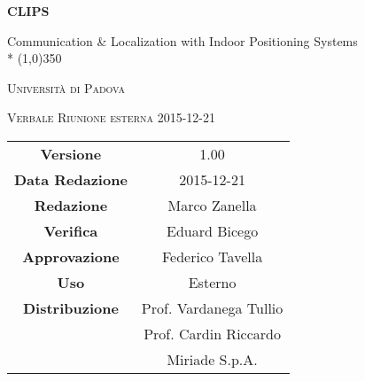 \documentclass[a4paper,12pt]{article}
\author{Marco Zanella}
\date{22/12/2015}
\begin{document}
\begin{titlepage}
	\centering
	{\huge\bfseries CLIPS\par}
	Communication \& Localization with Indoor Positioning Systems \\*
	\line(1,0){350} \\
	{\scshape\LARGE Università di Padova \par}
	\vspace{1cm}
	{\scshape\Large Verbale Riunione esterna 2015-12-21 \par}
	\logo
	\newpage
		\begin{tabular}{c|c}
		{\hfill\textbf{Versione}} 			& 1.00				\\ 
		{\hfill\textbf{Data Redazione}} 	& 2015-12-21	  		 \\
		{\hfill\textbf{Redazione}} 			& Marco Zanella		\\ 
		{\hfill\textbf{Verifica}} 			& Eduard Bicego		\\ 
		{\hfill\textbf{Approvazione}} 		& Federico Tavella	\\ 
		{\hfill\textbf{Uso}} 				& Esterno	\\ 
		{\hfill\textbf{Distribuzione}} 		& Prof. Vardanega Tullio \\
											& Prof. Cardin Riccardo \\
											& Miriade S.p.A. \\ 
	\end{tabular}
\end{titlepage}
	
	\newpage

	\pagestyle{myfront}
	\newpage

	
	\label{LastFrontPage}
	

	\newpage
	
	\pagestyle{mymain}
	
	
		

	
		
	
	
		
	
	
		
				
	\label{LastPage}
\end{document}
